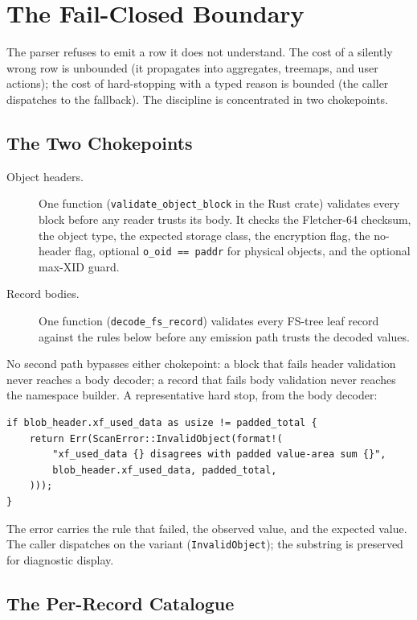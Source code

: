 \chapter{The Fail-Closed Boundary}

The parser refuses to emit a row it does not understand. The cost
of a silently wrong row is unbounded (it propagates into
aggregates, treemaps, and user actions); the cost of hard-stopping
with a typed reason is bounded (the caller dispatches to the
fallback). The discipline is concentrated in two chokepoints.

\section{The Two Chokepoints}

\begin{description}
  \item[Object headers.] One function
    (\texttt{validate\_object\_block} in the Rust crate) validates
    every block before any reader trusts its body. It checks the
    Fletcher-64 checksum, the object type, the expected storage
    class, the encryption flag, the no-header flag, optional
    \texttt{o\_oid == paddr} for physical objects, and the optional
    max-XID guard.
  \item[Record bodies.] One function (\texttt{decode\_fs\_record})
    validates every FS-tree leaf record against the rules below
    before any emission path trusts the decoded values.
\end{description}

No second path bypasses either chokepoint: a block that fails
header validation never reaches a body decoder; a record that
fails body validation never reaches the namespace builder. A
representative hard stop, from the body decoder:

\begin{verbatim}
if blob_header.xf_used_data as usize != padded_total {
    return Err(ScanError::InvalidObject(format!(
        "xf_used_data {} disagrees with padded value-area sum {}",
        blob_header.xf_used_data, padded_total,
    )));
}
\end{verbatim}

The error carries the rule that failed, the observed value, and
the expected value. The caller dispatches on the variant
(\texttt{InvalidObject}); the substring is preserved for
diagnostic display.

\section{The Per-Record Catalogue}


